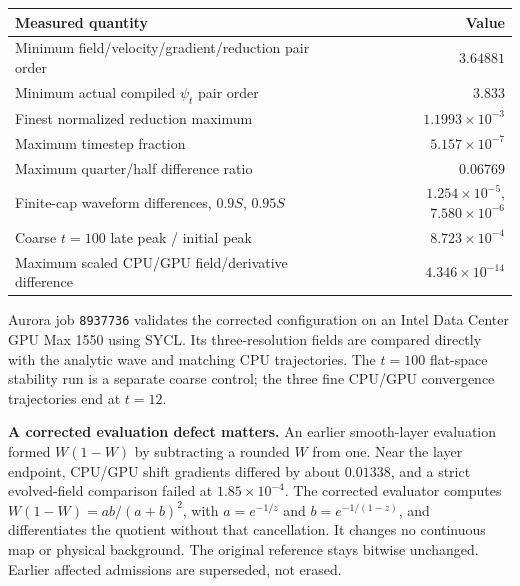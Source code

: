 \documentclass[11pt,letterpaper]{article}
\begin{document}

\begin{center}\small
\begin{tabularx}{\linewidth}{@{}Xr@{}}\toprule
Measured quantity & Value \\\midrule
Minimum field/velocity/gradient/reduction pair order & $3.64881$ \\
Minimum actual compiled $\psi_t$ pair order & $3.833$ \\
Finest normalized reduction maximum & $1.1993\times10^{-3}$ \\
Maximum timestep fraction & $5.157\times10^{-7}$ \\
Maximum quarter/half difference ratio & $0.06769$ \\
Finite-cap waveform differences, $0.9S$, $0.95S$ & $1.254\times10^{-5}$, $7.580\times10^{-6}$ \\
Coarse $t=100$ late peak / initial peak & $8.723\times10^{-4}$ \\
Maximum scaled CPU/GPU field/derivative difference & $4.346\times10^{-14}$ \\\bottomrule
\end{tabularx}
\end{center}

Aurora job \texttt{8937736} validates the corrected configuration on an Intel Data Center GPU Max 1550 using SYCL. Its three-resolution fields are compared directly with the analytic wave and matching CPU trajectories. The $t=100$ flat-space stability run is a separate coarse control; the three fine CPU/GPU convergence trajectories end at $t=12$.

\textbf{A corrected evaluation defect matters.} An earlier smooth-layer evaluation formed $W(1-W)$ by subtracting a rounded $W$ from one. Near the layer endpoint, CPU/GPU shift gradients differed by about $0.01338$, and a strict evolved-field comparison failed at $1.85\times10^{-4}$. The corrected evaluator computes $W(1-W)=ab/(a+b)^2$, with $a=e^{-1/z}$ and $b=e^{-1/(1-z)}$, and differentiates the quotient without that cancellation. It changes no continuous map or physical background. The original reference stays bitwise unchanged. Earlier affected admissions are superseded, not erased.
\end{document}
